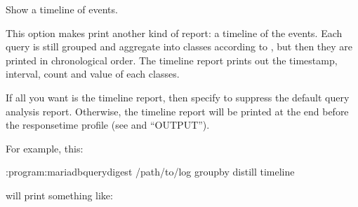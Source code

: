 \documentclass[letterpaper,10pt,english]{sphinxmanual}
\begin{document}
\begin{fulllineitems}
\label{\detokenize{mariadb-query-digest:cmdoption-mariadb-query-digest-timeline}}
Show a timeline of events.

This option makes  print another kind of report: a timeline of
the events.  Each query is still grouped and aggregate into classes according to
{\hyperref[\detokenize{mariadb-query-digest:cmdoption-mariadb-query-digest-group-by}]{}}, but then they are printed in chronological order.  The timeline
report prints out the timestamp, interval, count and value of each classes.

If all you want is the timeline report, then specify  to
suppress the default query analysis report.  Otherwise, the timeline report
will be printed at the end before the response\sphinxhyphen{}time profile
(see {\hyperref[\detokenize{mariadb-query-digest:cmdoption-mariadb-query-digest-report-format}]{}} and “OUTPUT”).

For example, this:

\begin{sphinxVerbatim}[commandchars=\\\{\}]
:program:mariadb\PYGZhy{}query\PYGZhy{}digest /path/to/log \PYGZhy{}\PYGZhy{}group\PYGZhy{}by distill \PYGZhy{}\PYGZhy{}timeline
\end{sphinxVerbatim}

will print something like:


\end{fulllineitems}
\end{document}

